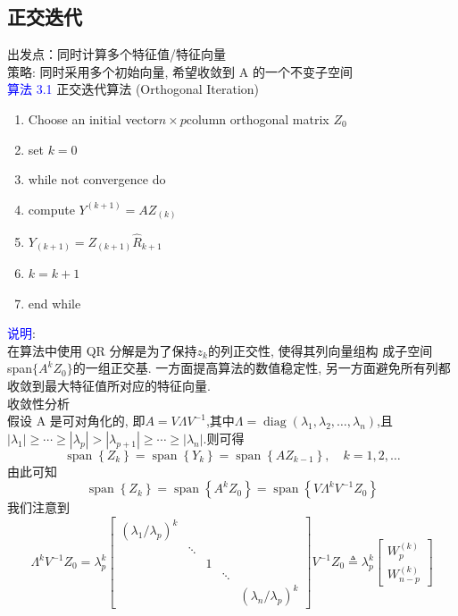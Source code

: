 \documentclass[12pt,a4paper]{article}
\begin{document}
	\subsection{正交迭代}
	\noindent 出发点：同时计算多个特征值/特征向量\\
	策略: 同时采用多个初始向量, 希望收敛到 A 的一个不变子空间\\
	\textcolor{blue}{算法 3.1} 正交迭代算法 (Orthogonal Iteration)\\
	\begin{enumerate}[1:]
		\item Choose an initial vector$n\times p$column orthogonal matrix $Z_{0}$ 
		\item set $k=0$
		\item while not convergence do
		\item \qquad compute $Y^{(k+1)} = AZ_{(k)}$
		\item \qquad$Y_{(k+1)}=Z_{(k+1)}\hat{R}_{k+1}$
		\item \qquad$k=k+1$
		\item end while
	\end{enumerate}
	\textcolor{blue}{说明}:\\
	在算法中使用 QR 分解是为了保持$z_k$的列正交性, 使得其列向量组构 成子空间 span$\{A^kZ_0\}$的一组正交基. 一方面提高算法的数值稳定性, 另一方面避免所有列都收敛到最大特征值所对应的特征向量.\\
	收敛性分析\\
	假设 A 是可对角化的, 即$A=V \Lambda V^{-1}$,其中$\Lambda=\operatorname{diag}\left(\lambda_{1}, \lambda_{2}, \ldots, \lambda_{n}\right)$,且$\left|\lambda_{1}\right| \geq \cdots \geq\left|\lambda_{p}\right|>\left|\lambda_{p+1}\right| \geq \cdots \geq\left|\lambda_{n}\right|$.则可得
	$$
	\operatorname{span}\left\{Z_{k}\right\}=\operatorname{span}\left\{Y_{k}\right\}=\operatorname{span}\left\{A Z_{k-1}\right\}, \quad k=1,2, \ldots
	$$
	由此可知
	$$
	\operatorname{span}\left\{Z_{k}\right\}=\operatorname{span}\left\{A^{k} Z_{0}\right\}=\operatorname{span}\left\{V \Lambda^{k} V^{-1} Z_{0}\right\}
	$$
	我们注意到
	$$
	\Lambda^{k} V^{-1} Z_{0}=\lambda_{p}^{k}\left[\begin{array}{ccccc}
	{\left(\lambda_{1} / \lambda_{p}\right)^{k}} & {} & {} &{}&{}\\ 
	{} & {\ddots} & {} & {} &{}\\
	{} & {} & {1}& {} & {} \\ 
	{} & {} & {} & {\ddots} & {} \\
	{} & {} & {} & {} & {\left(\lambda_{n} / \lambda_{p}\right)^{k}}
	\end{array}\right]V^{-1} Z_{0} \triangleq \lambda_{p}^{k}\left[\begin{array}{c}
	{W_{p}^{(k)}} \\ 
	{W_{n-p}^{(k)}}
	\end{array}\right]
	$$
\end{document}
